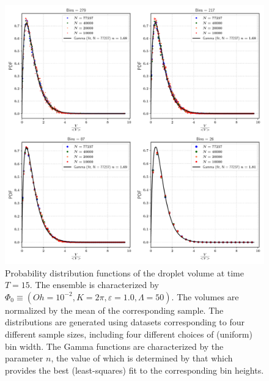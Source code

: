 \begin{figure}
\centering
\includegraphics{plots/drop_stats/short_time_volume_bins.pdf}
\caption{Probability distribution functions of the droplet volume at time $T = 15$. 
The ensemble is characterized by $\Phi_0 \equiv \left( Oh = 10^{-2}, K = 2\pi , \varepsilon = 1.0 , \Lambda = 50 \right)$. 
The volumes are normalized by the mean of the corresponding sample.  
The distributions are generated using datasets corresponding to four different sample sizes, 
including four different choices of (uniform) bin width. 
The Gamma functions are characterized by the parameter $n$, the value of which is determined 
by that which provides the best (least-squares) fit to the corresponding bin heights.  
	}
\label{t1_vol_bins}
\end{figure}





